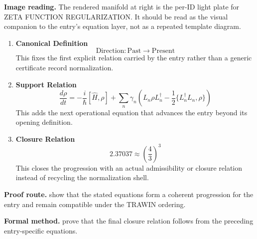 \begin{samepage}
\noindent\begin{minipage}[t]{0.45\linewidth}
\vspace{0pt}
\raggedright
\scriptsize\textbf{Image reading.} The rendered manifold at right is the per-ID light plate for ZETA FUNCTION REGULARIZATION. It should be read as the visual companion to the entry's equation layer, not as a repeated template diagram.\par
\end{minipage}\hfill
\begin{minipage}[t]{0.53\linewidth}
\vspace*{-0.10in}
\raggedright
{}
\end{minipage}
\end{samepage}

\clearpage


\begin{enumerate}[leftmargin=1.6em,itemsep=9pt,topsep=6pt]
\item \textbf{Canonical Definition}
\[
\mathrm{Direction}:\mathrm{Past}\to\mathrm{Present}
\]
This fixes the first explicit relation carried by the entry rather than a generic certificate record normalization.

\item \textbf{Support Relation}
\[
\frac{d\rho}{dt}
=
-\frac{i}{\hbar}[\widehat{H},\rho]
+\sum_n\gamma_n\left(L_n\rho L_n^\dagger-\frac{1}{2}\{L_n^\dagger L_n,\rho\}\right)
\]
This adds the next operational equation that advances the entry beyond its opening definition.

\item \textbf{Closure Relation}
\[
2.37037\approx\left(\frac{4}{3}\right)^3
\]
This closes the progression with an actual admissibility or closure relation instead of recycling the normalization shell.
\end{enumerate}

\textbf{Proof route.} show that the stated equations form a coherent progression for the entry and remain compatible under the TRAWIN ordering.

\textbf{Formal method.} prove that the final closure relation follows from the preceding entry-specific equations.

\medskip
{}

